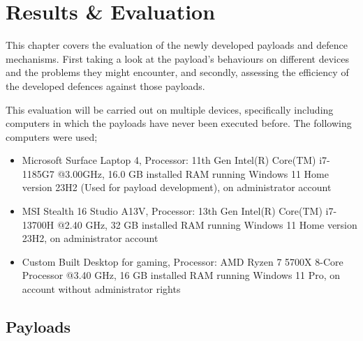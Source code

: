 \chapter{Results \& Evaluation} \label{Evaluation}

This chapter covers the evaluation of the newly developed payloads and defence mechanisms. First taking a look at the payload's behaviours on different devices and the problems they might encounter, and secondly, assessing the efficiency of the developed defences against those payloads.

This evaluation will be carried out on multiple devices, specifically including computers in which the payloads have never been executed before. The following computers were used;

\begin{itemize}
    \item Microsoft Surface Laptop 4, Processor: 11th Gen Intel(R) Core(TM) i7-1185G7 @3.00GHz, 16.0 GB installed RAM running Windows 11 Home version 23H2 (Used for payload development), on administrator account
    \item MSI Stealth 16 Studio A13V, Processor: 13th Gen Intel(R) Core(TM) i7-13700H @2.40 GHz, 32 GB installed RAM running Windows 11 Home version 23H2, on administrator account
    \item Custom Built Desktop for gaming, Processor: AMD Ryzen 7 5700X 8-Core Processor @3.40 GHz, 16 GB installed RAM running Windows 11 Pro, on account without administrator rights
\end{itemize}
    


\section{Payloads}

